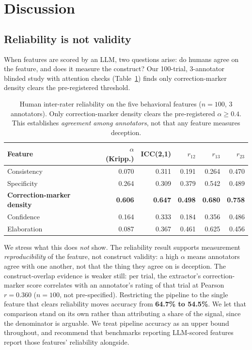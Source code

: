 \section{Discussion}
\label{sec:discussion}

\subsection{Reliability is not validity}
\label{sec:validity}

When features are scored by an LLM, two questions arise: do humans agree on the feature, and does it measure the construct? Our 100-trial, 3-annotator blinded study with attention checks (Table~\ref{tab:icc}) finds only correction-marker density clears the pre-registered threshold.

\begin{table}[h]
\centering
\small
\caption{Human inter-rater reliability on the five behavioral features ($n\!=\!100$, 3 annotators). Only correction-marker density clears the pre-registered $\alpha\!\geq\!0.4$. This establishes \emph{agreement among annotators}, not that any feature measures deception.}
\label{tab:icc}
\begin{tabular}{lrrrrr}
\toprule
\textbf{Feature} & $\alpha$ \textbf{(Kripp.)} & \textbf{ICC(2,1)} & $r_{12}$ & $r_{13}$ & $r_{23}$ \\
\midrule
Consistency & 0.070 & 0.311 & 0.191 & 0.264 & 0.470 \\
Specificity & 0.264 & 0.309 & 0.379 & 0.542 & 0.489 \\
\textbf{Correction-marker density} & \textbf{0.606} & \textbf{0.647} & \textbf{0.498} & \textbf{0.680} & \textbf{0.758} \\
Confidence & 0.164 & 0.333 & 0.184 & 0.356 & 0.486 \\
Elaboration & 0.087 & 0.367 & 0.461 & 0.625 & 0.456 \\
\bottomrule
\end{tabular}
\end{table}

We stress what this does \emph{not} show. The reliability result supports measurement \emph{reproducibility} of the feature, not construct validity: a high $\alpha$ means annotators agree with one another, not that the thing they agree on is deception. The construct-overlap evidence is weaker still: per trial, the extractor's correction-marker score correlates with an annotator's rating of that trial at Pearson $r\!=\!0.360$ ($n\!=\!100$, not pre-specified). Restricting the pipeline to the single feature that clears reliability moves accuracy from \textbf{64.7\% to 54.5\%}. We let that comparison stand on its own rather than attributing a share of the signal, since the denominator is arguable. We treat pipeline accuracy as an upper bound throughout, and recommend that benchmarks reporting LLM-scored features report those features' reliability alongside.


